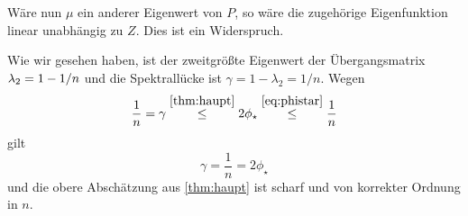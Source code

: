 \documentclass[ngerman,a4paper,11pt]{scrartcl}
\newcommand{\RR}{\mathbb{R}}
\DeclarePairedDelimiter{\sprod}{\langle}{\rangle}	%
\DeclarePairedDelimiter{\abs}{\lvert}{\rvert}		%
\begin{document}
\begin{exmp}
\begin{dproof}
  Wäre nun $\mu$ ein anderer Eigenwert von $P$, so
  wäre die zugehörige Eigenfunktion linear unabhängig zu $Z$. Dies ist ein Widerspruch.

 \end{dproof}
 Wie wir gesehen haben, ist der zweitgrößte Eigenwert der Übergangsmatrix
 $\lambda_2=\nobreak 1-\nobreak 1/n$ und die Spektrallücke ist $\gamma=1-\lambda_2=1/n$. Wegen
 \begin{equation*}
  \frac{1}{n}=\gamma\overset{\ref{thm:haupt}}{\leq} 2\phi_\star\overset{\eqref{eq:phistar}}{\leq}\frac{1}{n} 
 \end{equation*}
 gilt 
 \begin{equation*}
  \gamma=\frac{1}{n}=2\phi_\star 
 \end{equation*}
 und die obere Abschätzung aus \cref{thm:haupt} ist scharf und von korrekter
 Ordnung in $n$.
\end{exmp}
\end{document}
